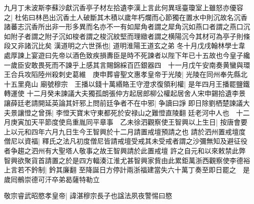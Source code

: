九月丁未波斯李蘇沙獻沉香亭子材左拾遺李漢上言此何異瑶臺瓊室上雖怒亦優容之|{
	杜佑曰林邑出沉香土人破斷其木積以歲年朽爛而心節獨在置水中則沉故名沉香諸蕃志沉香所出非一形多異而名亦不一有如犀角者謂之犀角沉如燕口者謂之燕口沉如附子者謂之附子沉如梭者謂之梭沉紋堅而理緻者謂之横陽沉今其材可為亭子則條段又非諸沉比矣}
漢道明之六世孫也|{
	道明淮陽王道玄之弟}
冬十月戊戌翰林學士韋處厚諫上宴遊曰先帝以酒色致疾損夀臣是時不死諫者以陛下年已十五故也今皇子纔一歲臣安敢畏死而不諫乎上感其言賜錦綵百匹銀器四　十一月戊午安南奏黄蠻與環王合兵攻䧟陸州殺刺史葛維　庚申葬睿聖文惠孝皇帝于光陵|{
	光陵在同州奉先縣北十五里堯山}
廟號穆宗　王播以錢十萬緡賂王守澄求復領利權|{
	是年四月王播罷鹽鐵轉運使}
十二月癸未諫議大夫獨孤朗張仲方起居郎柳公權起居舍人宋申錫拾遺李景讓薛廷老請開延英論其奸邪上問前廷争者不在中邪|{
	争讀曰諍}
即日除劉栖楚諫議大夫景讓憕之曾孫|{
	李憕天寶末守東都死於安禄山之難憕直陵翻}
廷老河中人也　十二月庚寅加天平節度使烏重胤同平章事　乙未徐泗觀察使王智興以上生日|{
	按唐會要上以元和四年六月九日生今王智興於十二月請置戒壇預請之也}
請於泗州置戒壇度僧尼以資福|{
	釋氏之法凡初度僧尼皆請戒壇受戒其未受戒者謂之沙彌無知及避征役者争趨之泗州有大聖塔人敬事之故王智興請於此置戒壇}
許之自元和以來敕禁此弊智興欲聚貨首請置之於是四方輻湊江淮尤甚智興家貲由此累鉅萬浙西觀察使李德裕上言若不鈐制|{
	鈐其廉翻}
至降誕日方停計兩浙福建當失六十萬丁奏至即日罷之　是歲囘鶻崇德可汗卒弟曷薩特勒立

敬宗睿武昭愍孝皇帝|{
	諱湛穆宗長子也諡法夙夜警惕曰愍}



